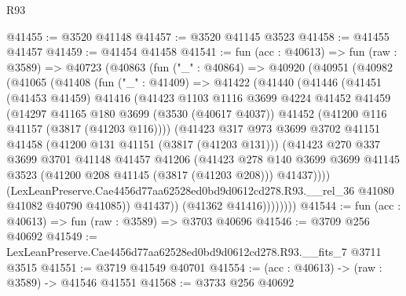 \begin{lexlean}{R93}
\begin{coremodule}
@41455 := @3520 @41148
@41457 := @3520 @41145 @3523
@41458 := @41455 @41457
@41459 := @41454 @41458
@41541 := fun (acc : @40613) =>
  fun (raw : @3589) =>
  @40723
    (@40863
      (fun ("_" : @40864) =>
      @40920
        (@40951
          (@40982
            (@41065
              (@41408
                (fun ("_" : @41409) =>
                @41422
                  (@41440
                    (@41446
                      (@41451
                        (@41453 @41459)
                        @41416
                        (@41423
                          @1103
                          @1116
                          @3699
                          @4224
                          @41452
                          @41459
                          (@14297
                            @41165
                            @180
                            @3699
                            (@3530 (@40617 @4037))
                            @41452
                            (@41200 @116 @41157 (@3817 (@41203 @116))))
                          (@41423
                            @317
                            @973
                            @3699
                            @3702
                            @41151
                            @41458
                            (@41200 @131 @41151 (@3817 (@41203 @131)))
                            (@41423
                              @270
                              @337
                              @3699
                              @3701
                              @41148
                              @41457
                              @41206
                              (@41423
                                @278
                                @140
                                @3699
                                @3699
                                @41145
                                @3523
                                (@41200 @208 @41145 (@3817 (@41203 @208)))
                                @41437))))
                        (LexLeanPreserve.Cae4456d77aa62528ed0bd9d0612cd278.R93.__rel_36
                          @41080
                          @41082
                          @40790
                          @41085))
                      @41437))
                  (@41362 @41416))))))))
@41544 := fun (acc : @40613) => fun (raw : @3589) => @3703 @40696
@41546 := @3709 @256 @40692
@41549 := LexLeanPreserve.Cae4456d77aa62528ed0bd9d0612cd278.R93.__fits_7 @3711 @3515
@41551 := @3719 @41549 @40701
@41554 := (acc : @40613) -> (raw : @3589) -> @41546 @41551
@41568 := @3733
    @256
    @40692

\end{coremodule}
\end{lexlean}

